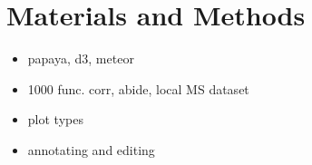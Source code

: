 \section{Materials and Methods}

\begin{itemize}
\item papaya, d3, meteor
\item 1000 func. corr, abide, local MS dataset
\item plot types
\item annotating and editing
\end{itemize}


